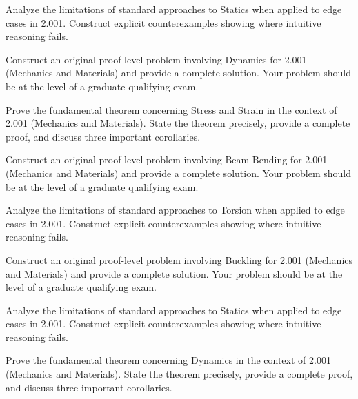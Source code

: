 \documentclass[12pt,a4paper]{exam}
\begin{document}
\begin{questions}

\question[3]
Analyze the limitations of standard approaches to Statics when applied to edge cases in 2.001. Construct explicit counterexamples showing where intuitive reasoning fails.

\vspace{0.3cm}

\question[6]
Construct an original proof-level problem involving Dynamics for 2.001 (Mechanics and Materials) and provide a complete solution. Your problem should be at the level of a graduate qualifying exam.

\vspace{0.3cm}

\question[3]
Prove the fundamental theorem concerning Stress and Strain in the context of 2.001 (Mechanics and Materials). State the theorem precisely, provide a complete proof, and discuss three important corollaries.

\vspace{0.3cm}

\question[4]
Construct an original proof-level problem involving Beam Bending for 2.001 (Mechanics and Materials) and provide a complete solution. Your problem should be at the level of a graduate qualifying exam.

\vspace{0.3cm}

\question[6]
Analyze the limitations of standard approaches to Torsion when applied to edge cases in 2.001. Construct explicit counterexamples showing where intuitive reasoning fails.

\vspace{0.3cm}

\question[3]
Construct an original proof-level problem involving Buckling for 2.001 (Mechanics and Materials) and provide a complete solution. Your problem should be at the level of a graduate qualifying exam.

\vspace{0.3cm}

\question[7]
Analyze the limitations of standard approaches to Statics when applied to edge cases in 2.001. Construct explicit counterexamples showing where intuitive reasoning fails.

\vspace{0.3cm}

\question[3]
Prove the fundamental theorem concerning Dynamics in the context of 2.001 (Mechanics and Materials). State the theorem precisely, provide a complete proof, and discuss three important corollaries.


\end{questions}
\end{document}
